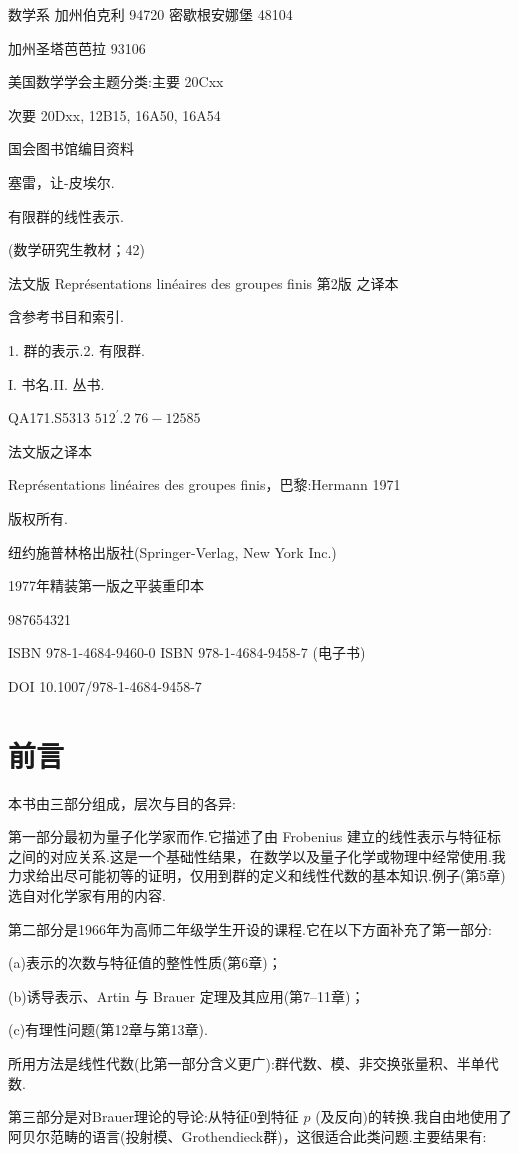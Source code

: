 \documentclass[10pt]{article}
\begin{document}
数学系 加州伯克利 94720 密歇根安娜堡 48104

加州圣塔芭芭拉 93106

美国数学学会主题分类:主要 20Cxx

次要 20Dxx, 12B15, 16A50, 16A54

国会图书馆编目资料

塞雷，让-皮埃尔.

有限群的线性表示.

(数学研究生教材；42)

法文版 Représentations linéaires des groupes finis 第2版 之译本

含参考书目和索引.

1. 群的表示.2. 有限群.

I. 书名.II. 丛书.

QA171.S5313 \({512}^{\prime }{.2}\;{76} - {12585}\)

法文版之译本

Représentations linéaires des groupes finis，巴黎:Hermann 1971

版权所有.

  纽约施普林格出版社(Springer-Verlag, New York Inc.)

1977年精装第一版之平装重印本

987654321

ISBN 978-1-4684-9460-0 ISBN 978-1-4684-9458-7 (电子书)

DOI 10.1007/978-1-4684-9458-7

\section*{前言}

本书由三部分组成，层次与目的各异:

第一部分最初为量子化学家而作.它描述了由 Frobenius 建立的线性表示与特征标之间的对应关系.这是一个基础性结果，在数学以及量子化学或物理中经常使用.我力求给出尽可能初等的证明，仅用到群的定义和线性代数的基本知识.例子(第5章)选自对化学家有用的内容.

第二部分是1966年为高师二年级学生开设的课程.它在以下方面补充了第一部分:

(a)表示的次数与特征值的整性性质(第6章)；

(b)诱导表示、Artin 与 Brauer 定理及其应用(第7–11章)；

(c)有理性问题(第12章与第13章).

所用方法是线性代数(比第一部分含义更广):群代数、模、非交换张量积、半单代数.

第三部分是对Brauer理论的导论:从特征0到特征 \(p\) (及反向)的转换.我自由地使用了阿贝尔范畴的语言(投射模、Grothendieck群)，这很适合此类问题.主要结果有:
\end{document}
